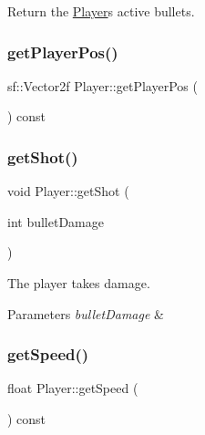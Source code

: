 Return the \hyperlink{class_player}{Player}\textquotesingle{}s active bullets. 

\mbox{\label{class_player_aab8a89629ae8acaf8c1dc4b2e9f052c6}} 
\subsubsection{\texorpdfstring{get\+Player\+Pos()}{getPlayerPos()}}
{\footnotesize\ttfamily sf\+::\+Vector2f Player\+::get\+Player\+Pos (\begin{DoxyParamCaption}{ }\end{DoxyParamCaption}) const\hspace{0.3cm}{\ttfamily [inline]}}

\mbox{\label{class_player_a13e6164daf86c00800992d756339fe51}} 
\subsubsection{\texorpdfstring{get\+Shot()}{getShot()}}
{\footnotesize\ttfamily void Player\+::get\+Shot (\begin{DoxyParamCaption}\item[{int}]{bullet\+Damage }\end{DoxyParamCaption})}



The player takes damage. 


\begin{DoxyParams}{Parameters}
{\em bullet\+Damage} & \\
\hline
\end{DoxyParams}
\mbox{\label{class_player_a515920b9f3992375f179ca17ee750dc1}} 
\subsubsection{\texorpdfstring{get\+Speed()}{getSpeed()}}
{\footnotesize\ttfamily float Player\+::get\+Speed (\begin{DoxyParamCaption}{ }\end{DoxyParamCaption}) const\hspace{0.3cm}{\ttfamily [inline]}}

